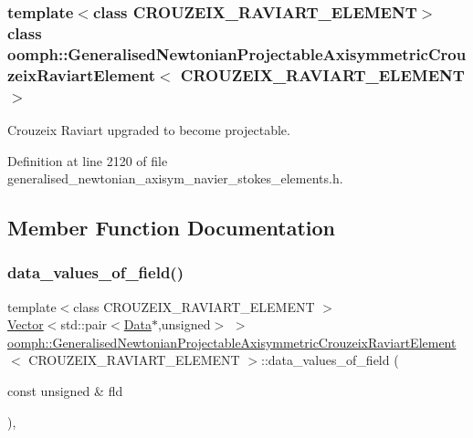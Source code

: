 \subsubsection*{template$<$class C\+R\+O\+U\+Z\+E\+I\+X\+\_\+\+R\+A\+V\+I\+A\+R\+T\+\_\+\+E\+L\+E\+M\+E\+NT$>$\newline
class oomph\+::\+Generalised\+Newtonian\+Projectable\+Axisymmetric\+Crouzeix\+Raviart\+Element$<$ C\+R\+O\+U\+Z\+E\+I\+X\+\_\+\+R\+A\+V\+I\+A\+R\+T\+\_\+\+E\+L\+E\+M\+E\+N\+T $>$}

Crouzeix Raviart upgraded to become projectable. 

Definition at line 2120 of file generalised\+\_\+newtonian\+\_\+axisym\+\_\+navier\+\_\+stokes\+\_\+elements.\+h.



\subsection{Member Function Documentation}
\mbox{\label{classoomph_1_1GeneralisedNewtonianProjectableAxisymmetricCrouzeixRaviartElement_acd407ccde8e91cbfa31bda2d62b606cf}} 
\subsubsection{\texorpdfstring{data\+\_\+values\+\_\+of\+\_\+field()}{data\_values\_of\_field()}}
{\footnotesize\ttfamily template$<$class C\+R\+O\+U\+Z\+E\+I\+X\+\_\+\+R\+A\+V\+I\+A\+R\+T\+\_\+\+E\+L\+E\+M\+E\+NT $>$ \\
\hyperlink{classoomph_1_1Vector}{Vector}$<$std\+::pair$<$\hyperlink{classoomph_1_1Data}{Data}$\ast$,unsigned$>$ $>$ \hyperlink{classoomph_1_1GeneralisedNewtonianProjectableAxisymmetricCrouzeixRaviartElement}{oomph\+::\+Generalised\+Newtonian\+Projectable\+Axisymmetric\+Crouzeix\+Raviart\+Element}$<$ C\+R\+O\+U\+Z\+E\+I\+X\+\_\+\+R\+A\+V\+I\+A\+R\+T\+\_\+\+E\+L\+E\+M\+E\+NT $>$\+::data\+\_\+values\+\_\+of\+\_\+field (\begin{DoxyParamCaption}\item[{const unsigned \&}]{fld }\end{DoxyParamCaption})\hspace{0.3cm}{\ttfamily [inline]}, {\ttfamily [virtual]}}



